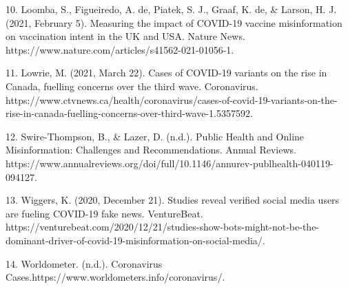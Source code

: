 \documentclass[10pt,twocolumn,letterpaper]{article}
\begin{document}
10. Loomba, S., Figueiredo, A. de, Piatek, S. J., Graaf, K. de, & Larson, H. J. (2021, February 5). Measuring the impact of COVID-19 vaccine misinformation on vaccination intent in the UK and USA. Nature News. https://www.nature.com/articles/s41562-021-01056-1. 

11. Lowrie, M. (2021, March 22). Cases of COVID-19 variants on the rise in Canada, fuelling concerns over the third wave. Coronavirus. https://www.ctvnews.ca/health/coronavirus/cases-of-covid-19-variants-on-the-rise-in-canada-fuelling-concerns-over-third-wave-1.5357592.     

12. Swire-Thompson, B., & Lazer, D. (n.d.). Public Health and Online Misinformation: Challenges and Recommendations. Annual Reviews. https://www.annualreviews.org/doi/full/10.1146/annurev-publhealth-040119-094127. 

13. Wiggers, K. (2020, December 21). Studies reveal verified social media users are fueling COVID-19 fake news. VentureBeat. https://venturebeat.com/2020/12/21/studies-show-bots-might-not-be-the-dominant-driver-of-covid-19-misinformation-on-social-media/. 

14. Worldometer. (n.d.). Coronavirus Cases.https://www.worldometers.info/coronavirus/.
\end{document}
